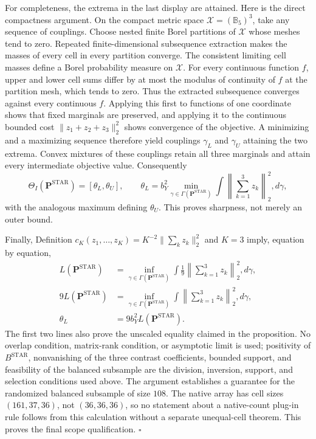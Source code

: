 For completeness, the extrema in the last display are attained.  Here is the
direct compactness argument.  On the compact metric space
\(\mathcal X=(\mathbb B_5)^3\), take any sequence of couplings.  Choose nested
finite Borel partitions of \(\mathcal X\) whose meshes tend to zero.  Repeated
finite-dimensional subsequence extraction makes the masses of every cell in
every partition converge.  The consistent limiting cell masses define a
Borel probability measure on \(\mathcal X\).  For every continuous function
\(f\), upper and lower cell sums differ by at most the modulus of continuity
of \(f\) at the partition mesh, which tends to zero.  Thus the extracted
subsequence converges against every continuous \(f\).  Applying this first to
functions of one coordinate shows that fixed marginals are preserved, and
applying it to the continuous bounded cost
\(\|z_1+z_2+z_3\|_2^2\) shows convergence of the objective.  A minimizing and
a maximizing sequence therefore yield couplings \(\gamma_L\) and
\(\gamma_U\) attaining the two extrema.  Convex mixtures of these couplings
retain all three marginals and attain every intermediate objective value.
Consequently
\[
 \Theta_I(\mathbf P^{\mathrm{STAR}})=[\theta_L,\theta_U],
 \qquad
 \theta_L=b_Y^2\min_{\gamma\in\Gamma(\mathbf P^{\mathrm{STAR}})}
 \int\left\|\sum_{k=1}^3z_k\right\|_2^2,d\gamma,
\]
with the analogous maximum defining \(\theta_U\).  This proves sharpness, not
merely an outer bound.

Finally, Definition \(c_K(z_1,\ldots,z_K)=K^{-2}\|\sum_kz_k\|_2^2\) and
\(K=3\) imply, equation by equation,
\[
\begin{aligned}
 L(\mathbf P^{\mathrm{STAR}})
 &=\inf_{\gamma\in\Gamma(\mathbf P^{\mathrm{STAR}})}
   \int\frac{1}{9}\left\|\sum_{k=1}^3z_k\right\|_2^2,d\gamma,\\
 9L(\mathbf P^{\mathrm{STAR}})
 &=\inf_{\gamma\in\Gamma(\mathbf P^{\mathrm{STAR}})}
   \int\left\|\sum_{k=1}^3z_k\right\|_2^2,d\gamma,\\
 \theta_L&=9b_Y^2L(\mathbf P^{\mathrm{STAR}}).
\end{aligned}
\]
The first two lines also prove the unscaled equality claimed in the
proposition.  No overlap condition, matrix-rank condition, or asymptotic limit
is used; positivity of \(B^{\mathrm{STAR}}\), nonvanishing of the three
contrast coefficients, bounded support, and feasibility of the balanced
subsample are the division, inversion, support, and selection conditions used
above.  The argument establishes a guarantee for the randomized balanced
subsample of size \(108\).  The native array has cell sizes \((161,37,36)\),
not \((36,36,36)\), so no statement about a native-count plug-in rule follows
from this calculation without a separate unequal-cell theorem.  This proves
the final scope qualification. \(\square\)
